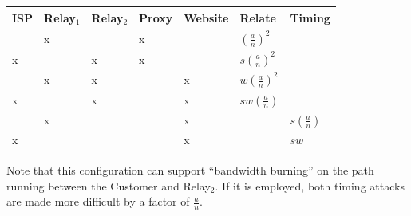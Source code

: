 \documentclass{article}
\begin{document}

\begin{center}
\begin{tabular}{l | l | l | l | l | l | l}
  ISP & Relay$_1$ & Relay$_2$ & Proxy & Website & Relate             & Timing \\
  \hline
      & x         &           & x     &         & $(\frac{a}{n})^2$  & \\
  \hline
  x   &           & x         & x     &         & $s(\frac{a}{n})^2$ & \\
  \hline
      & x         & x         &       & x       & $w(\frac{a}{n})^2$ & \\
  \hline
  x   &           & x         &       & x       & $sw(\frac{a}{n})$  & \\
  \hline
      & x         &           &       & x       &                    & $s(\frac{a}{n})$ \\
  \hline
  x   &           &           &       & x       &                    & $sw$ \\
\end{tabular}
\end{center}




Note that this configuration can support ``bandwidth burning'' on the
path running between the Customer and Relay$_2$. If it is employed,
both timing attacks are made more difficult by a factor of
$\frac{a}{n}$.
\end{document}
